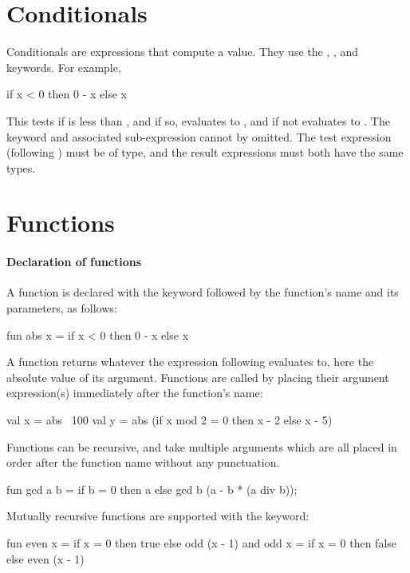 \documentclass[12pt,a4paper]{book}
\begin{document}
\section{Conditionals}

Conditionals are expressions that compute a value. They use the ,
, and  keywords. For example,
\begin{smlcode}
if x < 0 then 0 - x else x
\end{smlcode}
This tests if  is less than , and if so, evaluates to , and if not evaluates to .
The  keyword and associated sub-expression cannot by omitted. The test expression (following ) must be of  type, and the result expressions must both have the same types.

\section{Functions}
\label{sect:func}

\paragraph{Declaration of functions}
A function is declared with the  keyword followed by the
function's name and its parameters, as follows:
\begin{smlcode}
fun abs x =
  if x < 0 then 0 - x else x
\end{smlcode}

A function returns whatever the expression following \smlinline{=} evaluates
to, here the absolute value of its argument. Functions are called by placing
their argument expression(s) immediately after the function's name:
\begin{smlcode}
val x = abs ~100
val y = abs (if x mod 2 = 0 then x - 2 else x - 5)
\end{smlcode}

Functions can be recursive, and take multiple arguments which are all placed in
order after the function name without any punctuation.
\begin{smlcode}
fun gcd a b =
  if b = 0 then
    a
  else
    gcd b (a - b * (a div b));
\end{smlcode}

Mutually recursive functions are supported with the  keyword:
\begin{smlcode}
fun even x =
  if x = 0 then true
  else odd (x - 1)
and odd x =
  if x = 0 then false
  else even (x - 1)
\end{smlcode}
\end{document}
